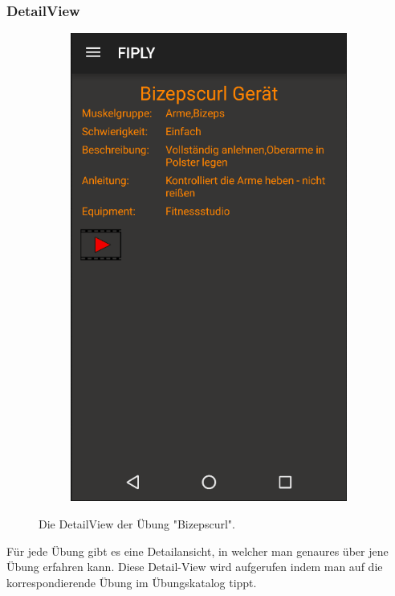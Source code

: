\documentclass[FIPLY_base.tex]{subfiles}
\begin{document}
\newpage


\subsubsection{DetailView}
\begin{figure}[H]
	\begin{subfigure}[b]{0.3\textwidth}
	\includegraphics[scale=0.55]{img/Uebungskatalog_detail}
	\end{subfigure}
	\hfil
	\caption{Die DetailView der Übung "Bizepscurl".}
\end{figure}



Für jede Übung gibt es eine Detailansicht, in welcher man genaures über jene Übung erfahren kann.
Diese Detail-View wird aufgerufen indem man auf die korrespondierende Übung im Übungskatalog tippt.
\end{document}
